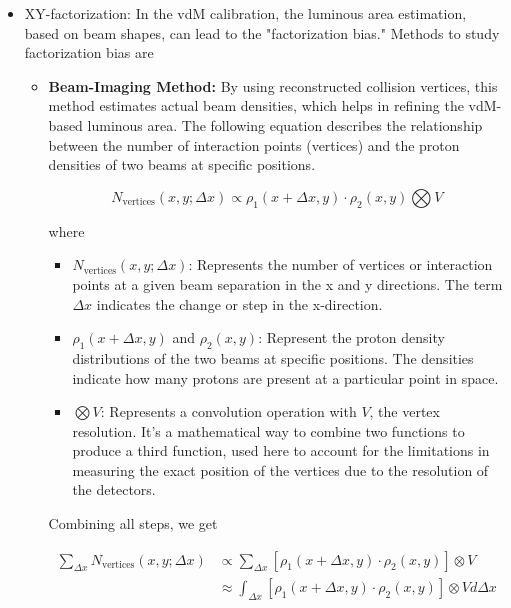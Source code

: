 \begin{itemize}

\item XY-factorization: In the vdM calibration, the luminous area estimation, based on beam shapes, can lead to the "factorization bias." Methods to study factorization bias are 

\begin{itemize}

\item \textbf{Beam-Imaging Method:} By using reconstructed collision vertices, this method estimates actual beam densities, which helps in refining the vdM-based luminous area. The following equation describes the relationship between the number of interaction points (vertices) and the proton densities of two beams at specific positions.

\begin{equation}
N_{\text{vertices}}(x, y; \Delta x) \propto \rho_1(x + \Delta x, y) \cdot \rho_2(x, y) \bigotimes V
\end{equation}

where
\begin{itemize}
  \item \(N_{\text{vertices}}(x, y; \Delta x)\): Represents the number of vertices or interaction points at a given beam separation in the x and y directions. The term \(\Delta x\) indicates the change or step in the x-direction.
  
  \item \(\rho_1(x + \Delta x, y)\) and \(\rho_2(x, y)\): Represent the proton density distributions of the two beams at specific positions. The densities indicate how many protons are present at a particular point in space.
  
  \item \(\bigotimes V\): Represents a convolution operation with \(V\), the vertex resolution. It's a mathematical way to combine two functions to produce a third function, used here to account for the limitations in measuring the exact position of the vertices due to the resolution of the detectors.
\end{itemize}

Combining all steps, we get

\begin{align}
\sum_{\Delta x} N_{\text{vertices}}(x, y; \Delta x) &\propto \sum_{\Delta x} \left[ \rho_1(x + \Delta x, y) \cdot \rho_2(x, y) \right] \otimes V \nonumber \\
&\approx \int_{\Delta x} \left[ \rho_1(x + \Delta x, y) \cdot \rho_2(x, y) \right] \otimes V d\Delta x
\end{align}


\end{itemize}
\end{itemize}
